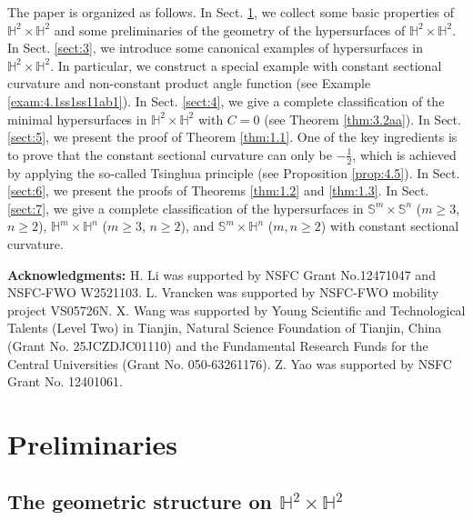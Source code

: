 \documentclass[reqno]{amsart}%
\theoremstyle{definition}
\numberwithin{equation}{section}
\begin{document}
The paper is organized as follows. In Sect. \ref{sect:2}, we  collect some basic properties of $\mathbb{H}^2\times \mathbb{H}^2$ and some preliminaries of the geometry of the hypersurfaces of $\mathbb{H}^2\times \mathbb{H}^2$. In Sect. \ref{sect:3}, we introduce some canonical examples of hypersurfaces in
$\mathbb{H}^2\times\mathbb{H}^2$. In particular, we construct a special  example with constant sectional curvature and non-constant product angle function (see Example \ref{exam:4.1ss1ss11ab1}). In Sect. \ref{sect:4}, we give a complete classification of the minimal hypersurfaces in $\mathbb{H}^2\times \mathbb{H}^2$ with $C=0$ (see Theorem \ref{thm:3.2aa}). %
In Sect. \ref{sect:5}, we present the proof of Theorem \ref{thm:1.1}. One of the key ingredients is to prove that the constant sectional curvature can only be $-\frac{1}{2}$, which is achieved by applying the so-called Tsinghua principle 
(see Proposition \ref{prop:4.5}). In Sect. \ref{sect:6}, we present the proofs of Theorems \ref{thm:1.2} 
and \ref{thm:1.3}. In Sect. \ref{sect:7}, we give a complete classification of the hypersurfaces 
in $\mathbb{S}^m\times \mathbb{S}^n$ ($m\geq3$, $n\geq2$), 
$\mathbb{H}^m\times \mathbb{H}^n$ ($m\geq3$, $n\geq2$), and $\mathbb{S}^m\times \mathbb{H}^n$ ($m,n\geq2$) with constant sectional curvature. 




\vskip 2mm

\textbf{Acknowledgments:} 
H. Li was supported by NSFC Grant No.12471047 and NSFC-FWO W2521103. 
L. Vrancken was supported by NSFC-FWO mobility project VS05726N. 
X. Wang was supported by Young Scientific and Technological Talents (Level Two) in Tianjin, Natural Science Foundation of Tianjin, China (Grant No. 25JCZDJC01110)  and the Fundamental Research Funds for the Central Universities (Grant No. 050-63261176). Z. Yao was supported by NSFC Grant No. 12401061.


\section{Preliminaries} \label{sect:2}
\subsection{The geometric structure on $\mathbb{H}^{2}\times \mathbb{H}^{2}$}~
\end{document}
